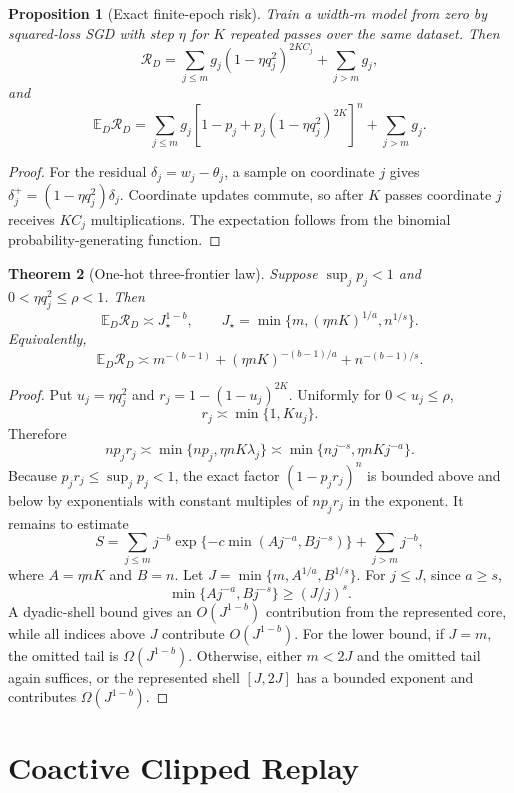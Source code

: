 \documentclass[letterpaper]{article}
\newtheorem{theorem}{Theorem}
\newtheorem{proposition}[theorem]{Proposition}
\newcommand{\E}{\mathbb E}
\newcommand{\R}{\mathcal R}
\newcommand{\1}{\mathbf 1}
\begin{document}
\begin{proposition}[Exact finite-epoch risk]
\label{prop:supp-onehot-exact}
Train a width-$m$ model from zero by squared-loss SGD with step $\eta$ for $K$
repeated passes over the same dataset. Then
\[
\R_D
=
\sum_{j\le m}g_j(1-\eta q_j^2)^{2KC_j}
+\sum_{j>m}g_j,
\]
and
\[
\E_D\R_D
=
\sum_{j\le m}g_j
[1-p_j+p_j(1-\eta q_j^2)^{2K}]^n
+\sum_{j>m}g_j.
\]
\end{proposition}

\begin{proof}
For the residual $\delta_j=w_j-\theta_j$, a sample on coordinate $j$ gives
$\delta_j^+=(1-\eta q_j^2)\delta_j$. Coordinate updates commute, so after $K$
passes coordinate $j$ receives $KC_j$ multiplications. The expectation follows
from the binomial probability-generating function.
\end{proof}

\begin{theorem}[One-hot three-frontier law]
\label{thm:supp-onehot-law}
Suppose $\sup_jp_j<1$ and $0<\eta q_j^2\le\rho<1$. Then
\[
\E_D\R_D
\asymp
J_\star^{1-b},
\qquad
J_\star=\min\{m,(\eta nK)^{1/a},n^{1/s}\}.
\]
Equivalently,
\[
\E_D\R_D
\asymp
m^{-(b-1)}+(\eta nK)^{-(b-1)/a}+n^{-(b-1)/s}.
\]
\end{theorem}

\begin{proof}
Put $u_j=\eta q_j^2$ and
$r_j=1-(1-u_j)^{2K}$. Uniformly for $0<u_j\le\rho$,
\[
r_j\asymp\min\{1,Ku_j\}.
\]
Therefore
\[
np_jr_j
\asymp
\min\{np_j,\eta nK\lambda_j\}
\asymp
\min\{nj^{-s},\eta nKj^{-a}\}.
\]
Because $p_jr_j\le\sup_jp_j<1$, the exact factor
$(1-p_jr_j)^n$ is bounded above and below by exponentials with constant
multiples of $np_jr_j$ in the exponent. It remains to estimate
\[
S=\sum_{j\le m}j^{-b}
\exp\{-c\min(Aj^{-a},Bj^{-s})\}
+\sum_{j>m}j^{-b},
\]
where $A=\eta nK$ and $B=n$. Let
$J=\min\{m,A^{1/a},B^{1/s}\}$. For $j\le J$, since $a\ge s$,
\[
\min\{Aj^{-a},Bj^{-s}\}\ge(J/j)^s.
\]
A dyadic-shell bound gives an $O(J^{1-b})$ contribution from the represented
core, while all indices above $J$ contribute $O(J^{1-b})$. For the lower
bound, if $J=m$, the omitted tail is $\Omega(J^{1-b})$. Otherwise, either
$m<2J$ and the omitted tail again suffices, or the represented shell
$[J,2J]$ has a bounded exponent and contributes $\Omega(J^{1-b})$.
\end{proof}

\section{Coactive Clipped Replay}
\end{document}
